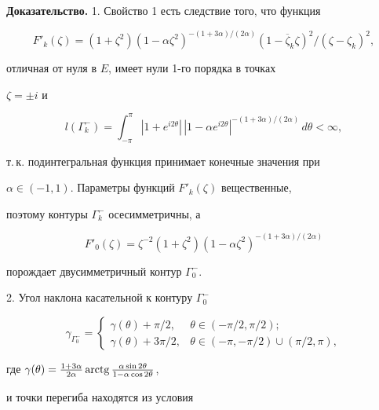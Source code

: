 {\bf Доказательство.} 1. Свойство 1 есть следствие того, что функция


$$


F'_k(\zeta)=(1+\zeta^2)(1-\alpha\zeta^2)^{-(1+3\alpha)/(2\alpha)}


(1-\overline\zeta_k\zeta)^2/(\zeta-\zeta_k)^2,


$$


отличная от нуля в $E$, имеет нули 1-го порядка в точках


$\zeta=\pm i$ и


$$


l({\Gamma }_k^{-})=\int_{-\pi}^\pi{|1+e^{i2\theta}|\,|1-\alpha e^{i2\theta}|


^{-(1+3\alpha)/(2\alpha)}}\,d\theta<\infty,


$$


т.\,к. подинтегральная функция принимает конечные значения при


$\alpha\in (-1,1)$. Параметры функций $F'_k(\zeta)$ вещественные,


поэтому контуры ${\Gamma }_k^{-}$ осесимметричны, а


\begin{equation}


F'_0(\zeta)=\zeta^{-2}(1+\zeta^2)(1-\alpha\zeta^2)^{-(1+3\alpha)/


(2\alpha)} 


\end{equation}


порождает двусимметричный контур ${\Gamma }_0^{-}$. 





2. Угол наклона касательной к контуру ${\Gamma }_0^{-}$


$$


\gamma_{{\Gamma }_0^{-}}=\begin{cases}\gamma(\theta)+\pi/2, & \theta


\in(-\pi/2, \pi/2);\\


\gamma(\theta)+3\pi/2, & \theta


\in(-\pi,-\pi/2)\cup(\pi/2,\pi),


\end{cases}


$$


где $\gamma(\theta)=\frac{1+3\alpha}{2\alpha}\arctg\frac{\alpha


\sin 2\theta}{1-\alpha\cos 2\theta}$,


и точки перегиба находятся из условия


